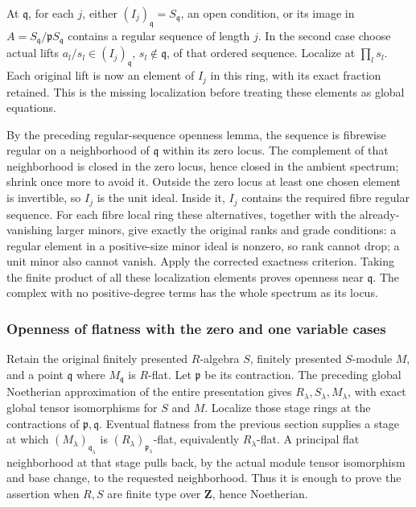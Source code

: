 At \(\mathfrak q\), for each \(j\), either \((I_j)_{\mathfrak q}=S_{\mathfrak q}\), an open condition, or its image in \(A=S_{\mathfrak q}/\mathfrak pS_{\mathfrak q}\) contains a regular sequence of length \(j\). In the second case choose actual lifts \(a_l/s_l\in(I_j)_{\mathfrak q}\), \(s_l\notin\mathfrak q\), of that ordered sequence. Localize at \(\prod_l s_l\). Each original lift is now an element of \(I_j\) in this ring, with its exact fraction retained. This is the missing localization before treating these elements as global equations.

By the preceding regular-sequence openness lemma, the sequence is fibrewise regular on a neighborhood of \(\mathfrak q\) within its zero locus. The complement of that neighborhood is closed in the zero locus, hence closed in the ambient spectrum; shrink once more to avoid it. Outside the zero locus at least one chosen element is invertible, so \(I_j\) is the unit ideal. Inside it, \(I_j\) contains the required fibre regular sequence. For each fibre local ring these alternatives, together with the already-vanishing larger minors, give exactly the original ranks and grade conditions: a regular element in a positive-size minor ideal is nonzero, so rank cannot drop; a unit minor also cannot vanish. Apply the corrected exactness criterion. Taking the finite product of all these localization elements proves openness near \(\mathfrak q\). The complex with no positive-degree terms has the whole spectrum as its locus.

\subsubsection{Openness of flatness with the zero and one variable cases}\label{algebra-proof-039-openness-of-flatness-with-the-zero-and-one-variable-cases}

Retain the original finitely presented \(R\)-algebra \(S\), finitely presented \(S\)-module \(M\), and a point \(\mathfrak q\) where \(M_{\mathfrak q}\) is \(R\)-flat. Let \(\mathfrak p\) be its contraction. The preceding global Noetherian approximation of the entire presentation gives \(R_\lambda,S_\lambda,M_\lambda\), with exact global tensor isomorphisms for \(S\) and \(M\). Localize those stage rings at the contractions of \(\mathfrak p,\mathfrak q\). Eventual flatness from the previous section supplies a stage at which \((M_\lambda)_{\mathfrak q_\lambda}\) is \((R_\lambda)_{\mathfrak p_\lambda}\)-flat, equivalently \(R_\lambda\)-flat. A principal flat neighborhood at that stage pulls back, by the actual module tensor isomorphism and base change, to the requested neighborhood. Thus it is enough to prove the assertion when \(R,S\) are finite type over \(\mathbf Z\), hence Noetherian.

